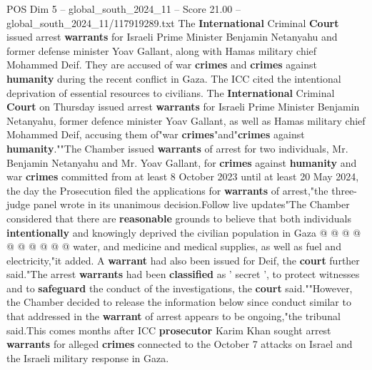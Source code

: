 \begin{textsample}{POS Dim 5 – global\_south\_2024\_11 – Score 21.00 – global\_south\_2024\_11/117919289.txt}  \label{ex:f5_pos_021}
The \textbf{International} Criminal \textbf{Court} issued arrest \textbf{warrants} for Israeli Prime Minister Benjamin Netanyahu and former defense minister Yoav Gallant, along with Hamas military chief Mohammed Deif.
They are accused of war \textbf{crimes} and \textbf{crimes} against \textbf{humanity} during the recent conflict in Gaza.
The ICC cited the intentional deprivation of essential resources to civilians.
The \textbf{International} Criminal \textbf{Court} on Thursday issued arrest \textbf{warrants} for Israeli Prime Minister Benjamin Netanyahu, former defence minister Yoav Gallant, as well as Hamas military chief Mohammed Deif, accusing them of"war \textbf{crimes}"and"\textbf{crimes} against \textbf{humanity}.""The Chamber issued \textbf{warrants} of arrest for two individuals, Mr.
Benjamin Netanyahu and Mr.
Yoav Gallant, for \textbf{crimes} against \textbf{humanity} and war \textbf{crimes} committed from at least 8 October 2023 until at least 20 May 2024, the day the Prosecution filed the applications for \textbf{warrants} of arrest,"the three-judge panel wrote in its unanimous decision.Follow live updates"The Chamber considered that there are \textbf{reasonable} grounds to believe that both individuals \textbf{intentionally} and knowingly deprived the civilian population in Gaza @ @ @ @ @ @ @ @ @ @ water, and medicine and medical supplies, as well as fuel and electricity,"it added.
A \textbf{warrant} had also been issued for Deif, the \textbf{court} further said."The arrest \textbf{warrants} had been \textbf{classified} as ' secret ', to protect witnesses and to \textbf{safeguard} the conduct of the investigations, the \textbf{court} said.""However, the Chamber decided to release the information below since conduct similar to that addressed in the \textbf{warrant} of arrest appears to be ongoing,"the tribunal said.This comes months after ICC \textbf{prosecutor} Karim Khan sought arrest \textbf{warrants} for alleged \textbf{crimes} connected to the October 7 attacks on Israel and the Israeli military response in Gaza.

\end{textsample}
